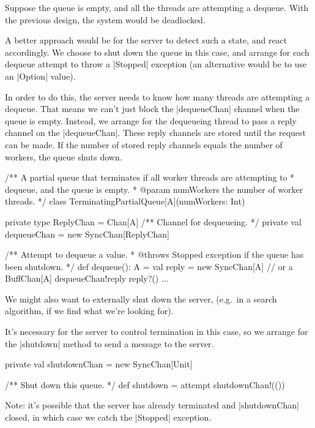 
\begin{slide}

Suppose the queue is empty, and all the threads are attempting a dequeue.
With the previous design, the system would be deadlocked.

A better approach would be for the server to detect such a state, and react
accordingly.  We choose to shut down the queue in this case, and arrange for
each dequeue attempt to throw a |Stopped| exception (an alternative would be
to use an |Option| value).

In order to do this, the server needs to know how many threads are attempting
a dequeue.  That means we can't just block the |dequeueChan| channel when the
queue is empty.  Instead, we arrange for the dequeueing thread to pass a reply
channel on the |dequeueChan|.  These reply channels are stored until the
request can be made.  If the number of stored reply channels equals the number
of workers, the queue shuts down.
\end{slide}


\begin{slide}

\begin{scala}
/** A partial queue that terminates if all worker threads are attempting to
  * dequeue, and the queue is empty.
  * @param numWorkers the number of worker threads. */
class TerminatingPartialQueue[A](numWorkers: Int){
  private type ReplyChan = Chan[A]
  /** Channel for dequeueing. */
  private val dequeueChan = new SyncChan[ReplyChan]

  /** Attempt to dequeue a value.
    * @throws Stopped exception if the queue has been shutdown. */
  def dequeue(): A = {
    val reply = new SyncChan[A] // or a BuffChan[A]
    dequeueChan!reply
    reply?()
  }
  ... 
}
\end{scala}
\end{slide}


\begin{slide}

We might also want to externally shut down the server, (e.g.~in a search
algorithm, if we find what we're looking for).

It's necessary for the server to control termination in this case, so we
arrange for the |shutdown| method to send a message to the server. 
%
\begin{scala}
  private val shutdownChan = new SyncChan[Unit]

  /** Shut down this queue. */
  def shutdown = attempt{ shutdownChan!(()) }{ }
\end{scala}
Note: it's possible that the server has already terminated and |shutdownChan|
closed, in which case we catch the |Stopped| exception.

\end{slide}
  
